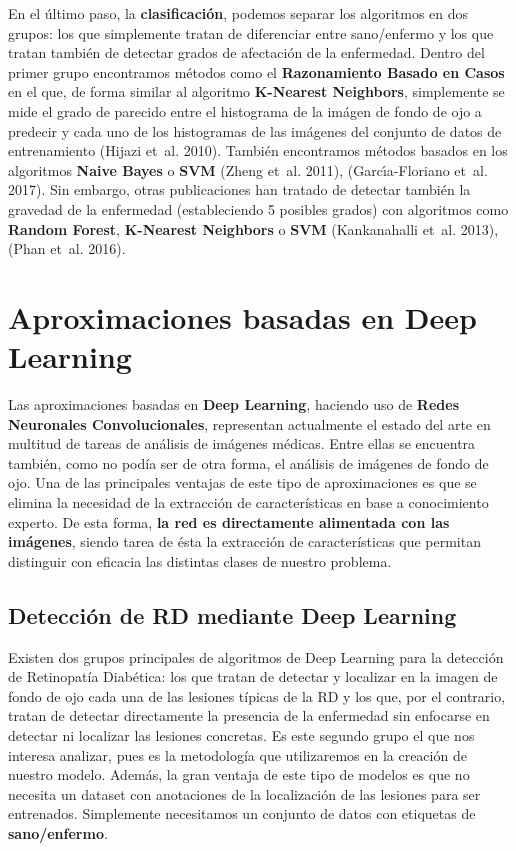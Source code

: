 \documentclass[
  12pt,
  spanish,
  a4paperpaper,
]{report}
\begin{document}
En el último paso, la \textbf{clasificación}, podemos separar los
algoritmos en dos grupos: los que simplemente tratan de diferenciar
entre sano/enfermo y los que tratan también de detectar grados de
afectación de la enfermedad. Dentro del primer grupo encontramos métodos
como el \textbf{Razonamiento Basado en Casos} en el que, de forma
similar al algoritmo \textbf{K-Nearest Neighbors}, simplemente se mide
el grado de parecido entre el histograma de la imágen de fondo de ojo a
predecir y cada uno de los histogramas de las imágenes del conjunto de
datos de entrenamiento (Hijazi et~al. 2010). También encontramos métodos
basados en los algoritmos \textbf{Naive Bayes} o \textbf{SVM} (Zheng
et~al. 2011), (Garcı́a-Floriano et~al. 2017). Sin embargo, otras
publicaciones han tratado de detectar también la gravedad de la
enfermedad (estableciendo 5 posibles grados) con algoritmos como
\textbf{Random Forest}, \textbf{K-Nearest Neighbors} o \textbf{SVM}
(Kankanahalli et~al. 2013), (Phan et~al. 2016).

\hypertarget{aproximaciones-basadas-en-deep-learning}{%
\section{Aproximaciones basadas en Deep
Learning}\label{aproximaciones-basadas-en-deep-learning}}

Las aproximaciones basadas en \textbf{Deep Learning}, haciendo uso de
\textbf{Redes Neuronales Convolucionales}, representan actualmente el
estado del arte en multitud de tareas de análisis de imágenes médicas.
Entre ellas se encuentra también, como no podía ser de otra forma, el
análisis de imágenes de fondo de ojo. Una de las principales ventajas de
este tipo de aproximaciones es que se elimina la necesidad de la
extracción de características en base a conocimiento experto. De esta
forma, \textbf{la red es directamente alimentada con las imágenes},
siendo tarea de ésta la extracción de características que permitan
distinguir con eficacia las distintas clases de nuestro problema.

\hypertarget{detecciuxf3n-de-rd-mediante-deep-learning}{%
\subsection{Detección de RD mediante Deep
Learning}\label{detecciuxf3n-de-rd-mediante-deep-learning}}

Existen dos grupos principales de algoritmos de Deep Learning para la
detección de Retinopatía Diabética: los que tratan de detectar y
localizar en la imagen de fondo de ojo cada una de las lesiones típicas
de la RD y los que, por el contrario, tratan de detectar directamente la
presencia de la enfermedad sin enfocarse en detectar ni localizar las
lesiones concretas. Es este segundo grupo el que nos interesa analizar,
pues es la metodología que utilizaremos en la creación de nuestro
modelo. Además, la gran ventaja de este tipo de modelos es que no
necesita un dataset con anotaciones de la localización de las lesiones
para ser entrenados. Simplemente necesitamos un conjunto de datos con
etiquetas de \textbf{sano/enfermo}.
\end{document}
